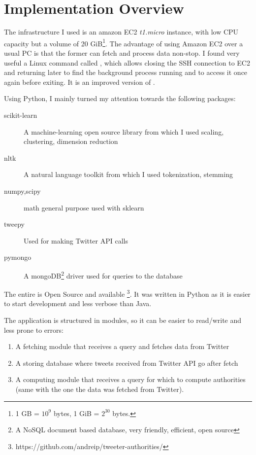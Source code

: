 \chapter{Implementation Overview}
\label{sec:implementation}

The infrastructure I used is an amazon EC2 \textit{t1.micro} instance, with low CPU capacity but a volume of 20 GiB\footnote{\label{gbi}1 GB = $10^9$ bytes, 1 GiB = $2^{30}$ bytes.}. The advantage of using Amazon EC2 over a usual PC is that the former can fetch and process data non-stop. I found very useful a Linux command called , which allows closing the SSH connection to EC2 and returning later to find the background process running and to access it once again before exiting. It is an improved version of .

Using Python, I mainly turned my attention towards the following packages:
\begin{description}
	\item[scikit-learn] A machine-learning open source library from which I used scaling, clustering, dimension reduction
    \item[nltk] A natural language toolkit from which I used tokenization, stemming
    \item[numpy,scipy] math general purpose used with sklearn
    \item[tweepy] Used for making Twitter API calls
	\item[pymongo] A mongoDB\footnote{\label{fn:mongodb}A NoSQL document based database, very friendly, efficient, open source} driver used for queries to the database
\end{description}

The entire  is Open Source and available \footnote{\label{github-code}https://github.com/andreip/tweeter-authorities/}. It was written in Python as it is easier to start development and less verbose than Java.

The application is structured in modules, so it can be easier to read/write and less prone to errors:
\begin{enumerate}
	\item A fetching module that receives a query and fetches data from Twitter
    \item A storing database where tweets received from Twitter API go after fetch
    \item A computing module that receives a query for which to compute authorities (same with the one the data was fetched from Twitter).
\end{enumerate}

